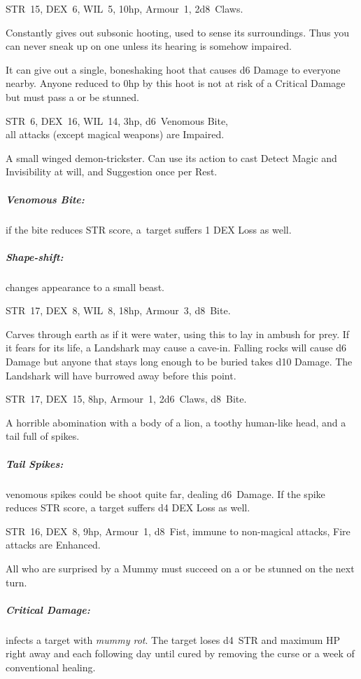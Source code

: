 \documentclass[itdr]{subfiles}
\begin{document}
\vfill

STR~15, DEX~6, WIL~5, 10hp, Armour~1, 2d8~Claws.

Constantly gives out subsonic hooting, used to sense its surroundings. Thus you can never sneak up on one unless its hearing is somehow impaired.

It can give out a single, boneshaking hoot that causes d6 Damage to everyone nearby. Anyone reduced to 0hp by this hoot is not at risk of a Critical Damage but must pass a  or be stunned.

\vfill

STR~6, DEX~16, WIL~14, 3hp, d6~Venomous Bite,\\all attacks (except magical weapons) are Impaired.

A small winged demon-trickster. Can use its action to cast Detect Magic and Invisibility at will, and Suggestion once per Rest.

\subparagraph{Venomous Bite:} if the bite reduces STR score, \mbox{a target} suffers 1 DEX Loss as well.

\subparagraph{Shape-shift:} changes appearance to a small beast.

\vfill
\break

STR~17, DEX~8, WIL~8, 18hp, Armour~3, d8~Bite.

Carves through earth as if it were water, using this to lay in ambush for prey. If it fears for its life, a Landshark may cause a cave-in. Falling rocks will cause d6 Damage but anyone that stays long enough to be buried takes d10 Damage. The Landshark will have burrowed away before this point.

\vfill

STR~17, DEX~15, 8hp, Armour~1, 2d6~Claws, d8~Bite.

A horrible abomination with a body of a lion, a toothy human-like head, and a tail full of spikes.

\subparagraph{Tail Spikes:} venomous spikes could be shoot quite far, dealing d6~Damage. If the spike reduces STR score, a target suffers d4 DEX Loss as well.

\vfill

STR~16, DEX~8, 9hp, Armour~1, d8~Fist, immune to non-magical attacks, Fire attacks are Enhanced.

All who are surprised by a Mummy must succeed on a  or be stunned on the next turn.

\subparagraph{Critical Damage:} infects a target with {\em mummy rot}. The target loses d4~STR and maximum HP right away and each following day until cured by removing the curse or a week of conventional healing.
\end{document}
